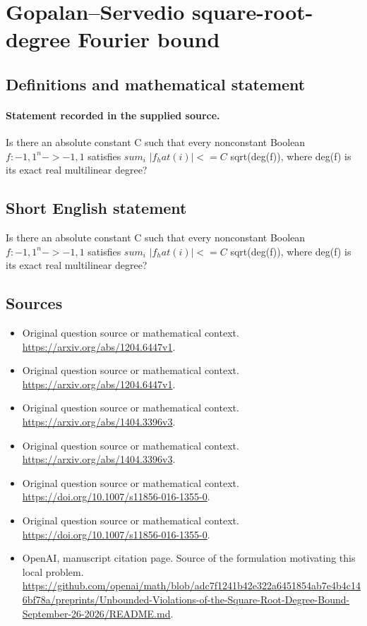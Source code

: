 \documentclass[11pt]{article}
\begin{document}
\section*{Gopalan–Servedio square-root-degree Fourier bound}\label{statement}
\subsection{Definitions and mathematical statement}
\paragraph{Statement recorded in the supplied source.}
Is there an absolute constant C such that every nonconstant Boolean $f:{-1,1}^n->{-1,1}$ satisfies $sum_i$ $|f_hat({i})|<=C$ sqrt(deg(f)), where deg(f) is its exact real multilinear degree?
\subsection{Short English statement}
Is there an absolute constant C such that every nonconstant Boolean $f:{-1,1}^n->{-1,1}$ satisfies $sum_i$ $|f_hat({i})|<=C$ sqrt(deg(f)), where deg(f) is its exact real multilinear degree?
\subsection{Sources}
\begin{itemize}
\item[S1] Original question source or mathematical context.
\url{https://arxiv.org/abs/1204.6447v1}.
\item[S2] Original question source or mathematical context.
\url{https://arxiv.org/abs/1204.6447v1}.
\item[S3] Original question source or mathematical context.
\url{https://arxiv.org/abs/1404.3396v3}.
\item[S4] Original question source or mathematical context.
\url{https://arxiv.org/abs/1404.3396v3}.
\item[S5] Original question source or mathematical context.
\url{https://doi.org/10.1007/s11856-016-1355-0}.
\item[S6] Original question source or mathematical context.
\url{https://doi.org/10.1007/s11856-016-1355-0}.
\item[S7] OpenAI, manuscript citation page. Source of the formulation motivating this local problem.
\url{https://github.com/openai/math/blob/adc7f1241b42e322a6451854ab7e4b4c146bf78a/preprints/Unbounded-Violations-of-the-Square-Root-Degree-Bound-September-26-2026/README.md}.
\end{itemize}
\end{document}

